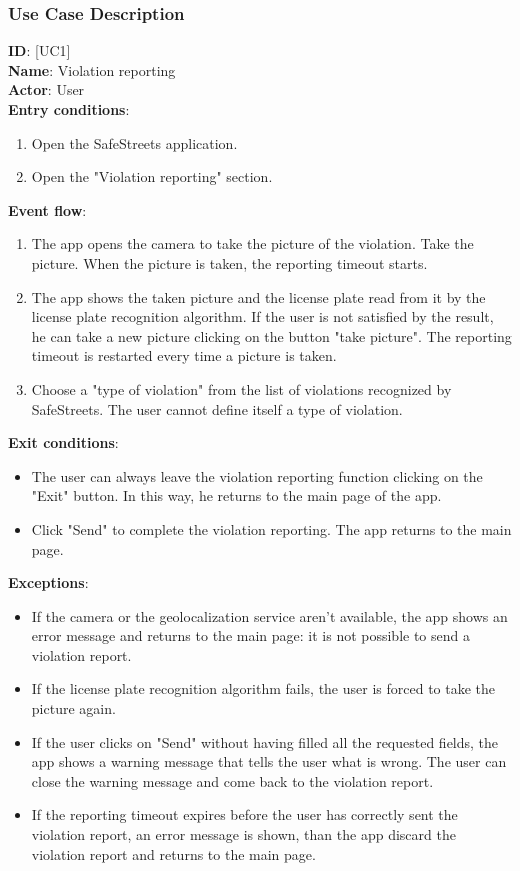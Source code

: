 \documentclass{article}
\newcommand\usecase[1]{ [UC#1] }
\begin{document}
			\clearpage
			\subsubsection{Use Case Description}
				
				\textbf{ID}: \usecase{1} \\
				\textbf{Name}:   Violation reporting\\
				\textbf{Actor}:  User\\
				\textbf{Entry conditions}:
				\begin{enumerate}
					\item Open the SafeStreets application.
					\item Open the "Violation reporting" section.
				\end{enumerate}
				\textbf{Event flow}:
				\begin{enumerate}
					\item The app opens the camera to take the picture of the violation. Take the picture. When the picture is taken, the reporting timeout starts.
					\item The app shows the taken picture and the license plate read from it by the license plate recognition algorithm. If the user is not satisfied by the result, he can take a new picture clicking on the button "take picture". The reporting timeout is restarted every time a picture is taken.
					\item Choose a "type of violation" from the list of violations recognized by SafeStreets. The user cannot define itself a type of violation.
				\end{enumerate}
				\textbf{Exit conditions}:
				\begin{itemize}
					\item The user can always leave the violation reporting function clicking on the "Exit" button. In this way, he returns to the main page of the app.
					\item Click "Send" to complete the violation reporting. The app returns to the main page.
				\end{itemize}
				\textbf{Exceptions}:
				\begin{itemize}
					\item If the camera or the geolocalization service aren't available, the app shows an error message and returns to the main page: it is not possible to send a violation report.
					\item If the license plate recognition algorithm fails, the user is forced to take the picture again.
					\item If the user clicks on "Send" without having filled all the requested fields, the app shows a warning message that tells the user what is wrong. The user can close the warning message and come back to the violation report. 
					\item If the reporting timeout expires before the user has correctly sent the violation report, an error message is shown, than the app discard the violation report and returns to the main page.\\
				\end{itemize}
			
\end{document}
